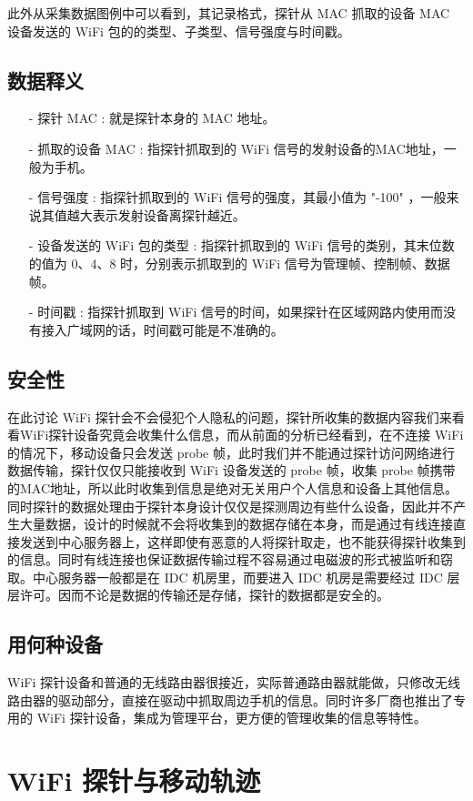 此外从采集数据图例中可以看到，其记录格式，探针从 MAC 抓取的设备 MAC 设备发送的 WiFi 包的的类型、子类型、信号强度与时间戳。

\subsection{数据释义}

\begin{itemize}
\item [-] 探针 MAC : 就是探针本身的 MAC 地址。
\item [-] 抓取的设备 MAC : 指探针抓取到的 WiFi 信号的发射设备的MAC地址，一般为手机。
\item [-] 信号强度 : 指探针抓取到的 WiFi 信号的强度，其最小值为 "-100" ，一般来说其值越大表示发射设备离探针越近。
\item [-] 设备发送的 WiFi 包的类型 : 指探针抓取到的 WiFi 信号的类别，其末位数的值为 0、4、8 时，分别表示抓取到的 WiFi 信号为管理帧、控制帧、数据帧。
\item [-] 时间戳 : 指探针抓取到 WiFi 信号的时间，如果探针在区域网路内使用而没有接入广域网的话，时间戳可能是不准确的。
\end{itemize}

\subsection{安全性}

在此讨论 WiFi 探针会不会侵犯个人隐私的问题，探针所收集的数据内容我们来看看WiFi探针设备究竟会收集什么信息，而从前面的分析已经看到，在不连接 WiFi 的情况下，移动设备只会发送 probe 帧，此时我们并不能通过探针访问网络进行数据传输，探针仅仅只能接收到 WiFi 设备发送的 probe 帧，收集 probe 帧携带的MAC地址，所以此时收集到信息是绝对无关用户个人信息和设备上其他信息。同时探针的数据处理由于探针本身设计仅仅是探测周边有些什么设备，因此并不产生大量数据，设计的时候就不会将收集到的数据存储在本身，而是通过有线连接直接发送到中心服务器上，这样即使有恶意的人将探针取走，也不能获得探针收集到的信息。同时有线连接也保证数据传输过程不容易通过电磁波的形式被监听和窃取。中心服务器一般都是在 IDC 机房里，而要进入 IDC 机房是需要经过 IDC 层层许可。因而不论是数据的传输还是存储，探针的数据都是安全的。

\subsection{用何种设备}

WiFi 探针设备和普通的无线路由器很接近，实际普通路由器就能做，只修改无线路由器的驱动部分，直接在驱动中抓取周边手机的信息。同时许多厂商也推出了专用的 WiFi 探针设备，集成为管理平台，更方便的管理收集的信息等特性。

\section{WiFi 探针与移动轨迹}
